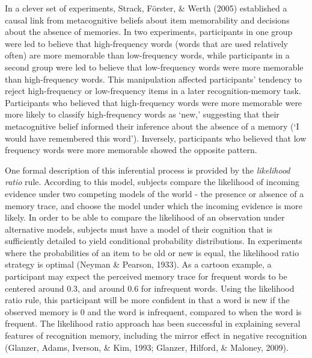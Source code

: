 \documentclass[12pt,twoside]{reedthesis}
\begin{document}
In a clever set of experiments, Strack, Förster, \& Werth (2005) established a causal link from metacognitive beliefs about item memorability and decisions about the absence of memories. In two experiments, participants in one group were led to believe that high-frequency words (words that are used relatively often) are more memorable than low-frequency words, while participants in a second group were led to believe that low-frequency words were more memorable than high-frequency words. This manipulation affected participants' tendency to reject high-frequency or low-frequency items in a later recognition-memory task. Participants who believed that high-frequency words were more memorable were more likely to classify high-frequency words as `new,' suggesting that their metacognitive belief informed their inference about the absence of a memory (`I would have remembered this word'). Inversely, participants who believed that low frequency words were more memorable showed the opposite pattern.

One formal description of this inferential process is provided by the \emph{likelihood ratio} rule. According to this model, subjects compare the likelihood of incoming evidence under two competing models of the world - the presence or absence of a memory trace, and choose the model under which the incoming evidence is more likely. In order to be able to compare the likelihood of an observation under alternative models, subjects must have a model of their cognition that is sufficiently detailed to yield conditional probability distributions. In experiments where the probabilities of an item to be old or new is equal, the likelihood ratio strategy is optimal (Neyman \& Pearson, 1933). As a cartoon example, a participant may expect the perceived memory trace for frequent words to be centered around 0.3, and around 0.6 for infrequent words. Using the likelihood ratio rule, this participant will be more confident in that a word is new if the observed memory is 0 and the word is infrequent, compared to when the word is frequent. The likelihood ratio approach has been successful in explaining several features of recognition memory, including the mirror effect in negative recognition (Glanzer, Adams, Iverson, \& Kim, 1993; Glanzer, Hilford, \& Maloney, 2009).
\end{document}
